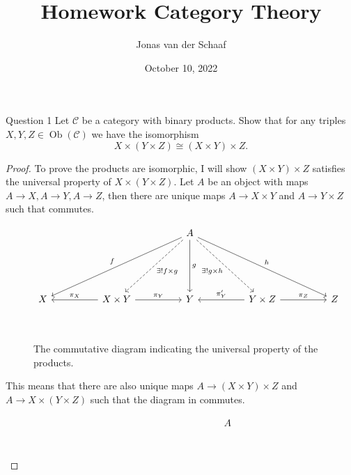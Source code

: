 \documentclass{article}
\title{Homework Category Theory}
\author{Jonas van der Schaaf}
\date{October 10, 2022}
\newcommand{\cat}{\mathcal{C}}
\DeclareMathOperator{\objects}{Ob}
\newenvironment{question}[1][]{\begin{paragraph}{Question #1}}{\end{paragraph}}
\theoremstyle{definition}
\begin{document}
\maketitle

\begin{question}[1]
    Let \(\cat\) be a category with binary products. Show that for any triples
    \(X,Y,Z\in\objects(\cat)\) we have the isomorphism
    \[
        X\times(Y\times Z)\cong (X\times Y)\times Z.
    \]

    \begin{proof}
        To prove the products are isomorphic, I will show \((X\times Y)\times
        Z\) satisfies the universal property of \(X\times(Y\times Z)\). Let
        \(A\) be an object with maps \(A\to X,A\to Y,A\to Z\), then there are
        unique maps \(A\to X\times Y\) and \(A\to Y\times Z\) such that
         commutes.
        \begin{figure}[H]
            \[
                \begin{tikzcd}[ampersand replacement=\&]
                    \&\&\&\& A \\
                    \\
                    \\
                    X \&\& {X\times Y} \&\& Y \&\& {Y\times Z} \&\& Z \\
                    \arrow["f"',from=1-5, to=4-1]
                    \arrow["g",from=1-5, to=4-5]
                    \arrow["h",from=1-5, to=4-9]
                    \arrow["\pi_{Z}",from=4-7, to=4-9]
                    \arrow["\pi_{Y}'"',from=4-7, to=4-5]
                    \arrow["\pi_{Y}", from=4-3, to=4-5]
                    \arrow["\pi_{X}"',from=4-3, to=4-1]
                    \arrow["{\exists!}f\times g", dashed, from=1-5, to=4-3]
                    \arrow["{\exists!}g\times h"', dashed, from=1-5, to=4-7]
                \end{tikzcd}
            \]
            \caption{The commutative diagram indicating the universal property of the products.}
            \label{fig:comm-dia-1}
        \end{figure}
        This means that there are also unique maps \(A\to (X\times Y)\times Z\)
        and \(A\to X\times(Y\times Z)\) such that the diagram in
         commutes.
        \begin{figure}[H]
            \[
                \begin{tikzcd}[ampersand replacement=\&]
                    \&\&\&\& A \\

\end{tikzcd}\]
\end{figure}
\end{proof}
\end{question}
\end{document}
